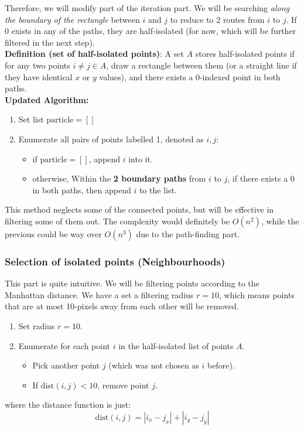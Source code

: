 \documentclass[11pt,a4paper]{scrartcl}
\begin{document}
Therefore, we will modify part of the iteration part. We will be searching \textit{along the boundary of the rectangle} between $i$ and $j$ to reduce to 2 routes from $i$ to $j$. If 0 exists in any of the paths, they are half-isolated (for now, which will be further filtered in the next step). \\

\textbf{Definition (set of half-isolated points)}: A set $A$ stores half-isolated points if for any two points $i \neq j \in A$, draw a rectangle between them (or a straight line if they have identical $x$ or $y$ values), and there exists a 0-indexed point in both paths. \\

\textbf{Updated Algorithm:}
\begin{enumerate}
    \item Set list $\text{particle} = []$
    \item Enumerate all pairs of points labelled 1, denoted as $i, j$:
    \begin{itemize}
        \item if $\text{particle} = []$, append $i$ into it. 
        \item otherwise, Within the \textbf{2 boundary paths} from $i$ to $j$, if there exists a 0 in both paths, then append $i$ to the list.
    \end{itemize}
\end{enumerate}

This method neglects some of the connected points, but will be effective in filtering some of them out. The complexity would definitely be $O(n^2)$, while the previous could be way over $O(n^3)$ due to the path-finding part.

\subsubsection{Selection of isolated points (Neighbourhoods)}

This part is quite intuitive. We will be filtering points according to the Manhattan distance. We have a set a filtering radius $r = 10$, which means points that are at most 10-pixels away from each other will be removed.

\begin{enumerate}
    \item Set radius $r = 10$.
    \item Enumerate for each point $i$ in the half-isolated list of points $A$.
    \begin{itemize}
        \item Pick another point $j$ (which was not chosen as $i$ before).
        \item If $\text{dist}(i,j) < 10$, remove point $j$.
    \end{itemize}
\end{enumerate}
where the distance function is just:
$$\text{dist}(i,j) = \left| i_x - j_x \right| + \left| i_y - j_y \right|$$
\end{document}
